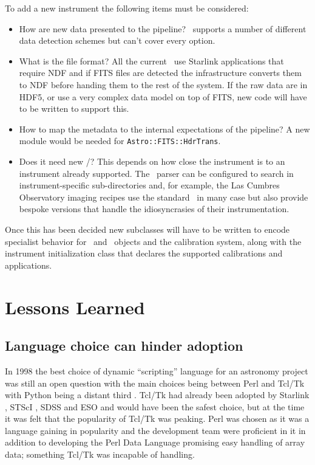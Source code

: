 \documentclass[final,authoryear,5p,times,twocolumn]{elsarticle}
\begin{document}
To add a new instrument the following items must be considered:

\begin{itemize}

\item How are new data presented to the pipeline? \oracdr\ supports a
  number of different data detection schemes but can't cover every option.

\item What is the file format? All the current \recipes\ use Starlink
  applications that require NDF \citep{ndfjenness} and if FITS
  files are detected the infrastructure converts them to NDF before
  handing them to the rest of the system. If the raw data are in HDF5,
  or use a very complex data model on top of FITS, new code will have
  to be written to support this.

\item How to map the metadata to the internal expectations of the
  pipeline? A new module would be needed for \texttt{Astro::FITS::HdrTrans}.

\item Does it need new \recipes/\primitives? This depends on how close
  the instrument is to an instrument already supported. The \recipe\
  parser can be configured to search in instrument-specific
  sub-directories and, for example, the Las Cumbres Observatory
  imaging recipes use the standard \primitives\ in many case but also
  provide bespoke versions that handle the idiosyncrasies of their
  instrumentation.

\end{itemize}

Once this has been decided new subclasses will have to be written to
encode specialist behavior for \Frame\ and \Group\ objects and the
calibration system, along with the instrument initialization class
that declares the supported calibrations and applications.

\section{Lessons Learned}

\subsection{Language choice can hinder adoption}

In 1998 the best choice of dynamic ``scripting'' language for an astronomy project was
still an open question with the main choices being between Perl and
Tcl/Tk with Python being a distant third
\citep{1995ComPh...9...57A,1999ASPC..172..494J,1999ASPC..172..483B,2000ASPC..216...91J}.
Tcl/Tk had already been adopted by Starlink
\citep{1995ASPC...77..395T}, STScI \citep{1998SPIE.3349...89D},
SDSS \citep{1996ASPC..101..248S} and ESO \citep{1996ASPC..101..396H,1995ASPC...77...58C} and
would have been the safest choice, but at the time it was felt that
the popularity of Tcl/Tk was peaking. Perl was chosen as it was a language
gaining in popularity and the development team were proficient in
it in addition to developing the Perl Data Language \citep[PDL;][]{PDL}
promising easy handling of array data; something Tcl/Tk was incapable
of handling.
\end{document}
